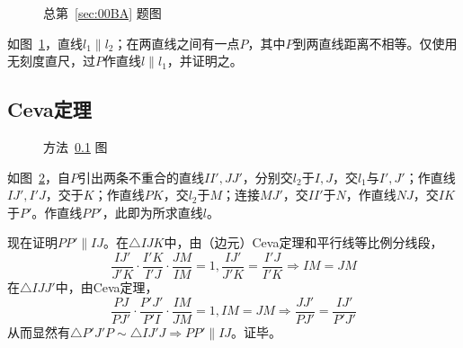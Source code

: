 

\begin{figure}[htbp]
  \centering {}
  \caption{总第~\ref{sec:00BA} 题图}
  \label{fig:00BA}
\end{figure}

如图~\ref{fig:00BA}，直线$l_1 \parallel l_2$；在两直线之间有一点$P$，其中$P$到两直线距离不相等。仅使用无刻度直尺，过$P$作直线$l \parallel l_1$，并证明之。

\subsection{Ceva定理} \label{subsec:00BA-ceva}

\begin{figure}[htbp]
  \centering {}
  \caption{方法~\ref{subsec:00BA-ceva} 图}
  \label{fig:00BA-ceva}
\end{figure}

如图~\ref{fig:00BA-ceva}，自$P$引出两条不重合的直线$II', JJ'$，分别交$l_2$于$I, J$，交$l_1$与$I', J'$；作直线$IJ', I'J$，交于$K$；作直线$PK$，交$l_2$于$M$；连接$MJ'$，交$II'$于$N$，作直线$NJ$，交$IK$于$P'$。作直线$PP'$，此即为所求直线$l$。

现在证明$PP' \parallel IJ$。在$\triangle IJK$中，由（边元）Ceva定理和平行线等比例分线段，
\[ \frac{IJ'}{J'K}\cdot\frac{I'K}{I'J}\cdot\frac{JM}{IM} = 1, \frac{IJ'}{J'K} = \frac{I'J}{I'K} \Rightarrow IM = JM \]
在$\triangle IJJ'$中，由Ceva定理，
\[ \frac{PJ}{PJ'}\cdot\frac{P'J'}{P'I}\cdot\frac{IM}{JM} = 1, IM = JM \Rightarrow \frac{JJ'}{PJ'} = \frac{IJ'}{P'J'} \]
从而显然有$\triangle P'J'P \sim \triangle IJ'J \Rightarrow PP' \parallel IJ$。证毕。
